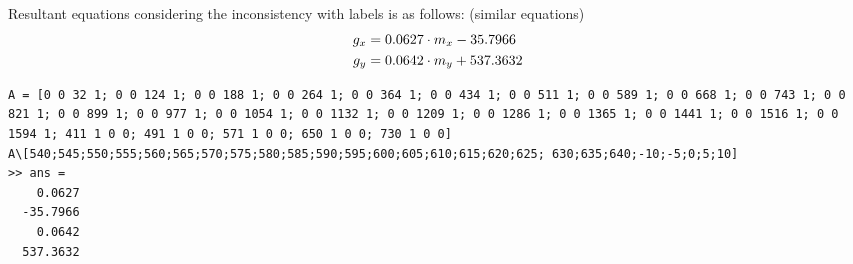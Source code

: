 \documentclass[a4paper]{article}
\begin{document}
Resultant equations considering the inconsistency with labels is as follows: (similar equations)
\begin{equation}{\label{eq:conversionbetter}}
	\begin{aligned}
		g_x &=  0.0627 \cdot m_x - 35.7966\\
		g_y &=  0.0642 \cdot m_y + 537.3632
	\end{aligned}
\end{equation}{\label{eq:conversion}}
\begin{verbatim}
A = [0 0 32 1; 0 0 124 1; 0 0 188 1; 0 0 264 1; 0 0 364 1; 0 0 434 1; 0 0 511 1; 0 0 589 1; 0 0 668 1; 0 0 743 1; 0 0 821 1; 0 0 899 1; 0 0 977 1; 0 0 1054 1; 0 0 1132 1; 0 0 1209 1; 0 0 1286 1; 0 0 1365 1; 0 0 1441 1; 0 0 1516 1; 0 0 1594 1; 411 1 0 0; 491 1 0 0; 571 1 0 0; 650 1 0 0; 730 1 0 0]
A\[540;545;550;555;560;565;570;575;580;585;590;595;600;605;610;615;620;625; 630;635;640;-10;-5;0;5;10]
>> ans =
    0.0627
  -35.7966
    0.0642
  537.3632
\end{verbatim}
\end{document}
